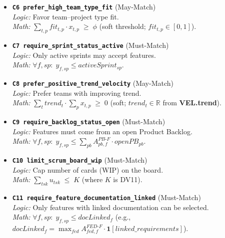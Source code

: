 \documentclass[11pt,a4paper]{article}
\begin{document}
\begin{itemize}[leftmargin=2em]
  \item \textbf{\texttt{C6 prefer\_high\_team\_type\_fit}} (May-Match) \\
    \textit{Logic:} Favor team--project type fit. \\
    \textit{Math:}\; $\sum_{t,p} fit_{t,p}\cdot x_{t,p} \;\ge\; \phi$ (soft threshold; $fit_{t,p}\in[0,1]$).

  \item \textbf{\texttt{C7 require\_sprint\_status\_active}} (Must-Match) \\
    \textit{Logic:} Only active sprints may accept features. \\
    \textit{Math:}\; $\forall f,sp:\; y_{f,sp} \le activeSprint_{sp}$.

  \item \textbf{\texttt{C8 prefer\_positive\_trend\_velocity}} (May-Match) \\
    \textit{Logic:} Prefer teams with improving trend. \\
    \textit{Math:}\; $\sum_{t} trend_t \cdot \sum_{p} x_{t,p} \;\ge\; 0$ (soft; $trend_t\in\mathbb{R}$ from \textbf{VEL.trend}).

  \item \textbf{\texttt{C9 require\_backlog\_status\_open}} (Must-Match) \\
    \textit{Logic:} Features must come from an open Product Backlog. \\
    \textit{Math:}\; $\forall f,sp:\; y_{f,sp} \le \sum_{pb} A^{PB\text{-}F}_{pb,f}\cdot openPB_{pb}$.

  \item \textbf{\texttt{C10 limit\_scrum\_board\_wip}} (Must-Match) \\
    \textit{Logic:} Cap number of cards (WIP) on the board. \\
    \textit{Math:}\; $\sum_{tsk} u_{tsk} \;\le\; K$ (where $K$ is DV11).

  \item \textbf{\texttt{C11 require\_feature\_documentation\_linked}} (Must-Match) \\
    \textit{Logic:} Only features with linked documentation can be selected. \\
    \textit{Math:}\; $\forall f,sp:\; y_{f,sp} \le docLinked_f$ (e.g., $docLinked_f=\max_{fed} A^{FED\text{-}F}_{fed,f}\cdot \mathbf{1}[linked\_requirements]$).
\end{itemize}
\end{document}

